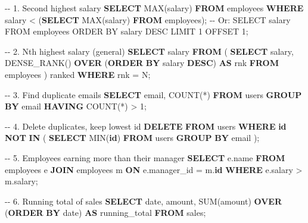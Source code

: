 \documentclass[11pt]{article}
\newenvironment{Shaded}{\begin{snugshade}}{\end{snugshade}}
\newcommand{\CommentTok}[1]{\textcolor[rgb]{0.48,0.49,0.49}{#1}}
\newcommand{\DataTypeTok}[1]{\textcolor[rgb]{0.16,0.50,0.73}{#1}}
\newcommand{\DecValTok}[1]{\textcolor[rgb]{0.96,0.45,0.00}{#1}}
\newcommand{\FunctionTok}[1]{\textcolor[rgb]{0.56,0.27,0.68}{#1}}
\newcommand{\KeywordTok}[1]{\textcolor[rgb]{0.81,0.81,0.76}{\textbf{#1}}}
\newcommand{\NormalTok}[1]{\textcolor[rgb]{0.81,0.81,0.76}{#1}}
\newcommand{\OperatorTok}[1]{\textcolor[rgb]{0.81,0.81,0.76}{#1}}
\begin{document}
\begin{Shaded}
\begin{Highlighting}[]
\CommentTok{{-}{-} 1. Second highest salary}
\KeywordTok{SELECT} \FunctionTok{MAX}\NormalTok{(salary) }\KeywordTok{FROM}\NormalTok{ employees }\KeywordTok{WHERE}\NormalTok{ salary }\OperatorTok{\textless{}}\NormalTok{ (}\KeywordTok{SELECT} \FunctionTok{MAX}\NormalTok{(salary) }\KeywordTok{FROM}\NormalTok{ employees);}
\CommentTok{{-}{-} Or: SELECT salary FROM employees ORDER BY salary DESC LIMIT 1 OFFSET 1;}

\CommentTok{{-}{-} 2. Nth highest salary (general)}
\KeywordTok{SELECT}\NormalTok{ salary }\KeywordTok{FROM}\NormalTok{ (}
    \KeywordTok{SELECT}\NormalTok{ salary, }\FunctionTok{DENSE\_RANK}\NormalTok{() }\KeywordTok{OVER}\NormalTok{ (}\KeywordTok{ORDER} \KeywordTok{BY}\NormalTok{ salary }\KeywordTok{DESC}\NormalTok{) }\KeywordTok{AS}\NormalTok{ rnk}
    \KeywordTok{FROM}\NormalTok{ employees}
\NormalTok{) ranked }\KeywordTok{WHERE}\NormalTok{ rnk }\OperatorTok{=}\NormalTok{ N;}

\CommentTok{{-}{-} 3. Find duplicate emails}
\KeywordTok{SELECT}\NormalTok{ email, }\FunctionTok{COUNT}\NormalTok{(}\OperatorTok{*}\NormalTok{) }\KeywordTok{FROM}\NormalTok{ users }\KeywordTok{GROUP} \KeywordTok{BY}\NormalTok{ email }\KeywordTok{HAVING} \FunctionTok{COUNT}\NormalTok{(}\OperatorTok{*}\NormalTok{) }\OperatorTok{\textgreater{}} \DecValTok{1}\NormalTok{;}

\CommentTok{{-}{-} 4. Delete duplicates, keep lowest id}
\KeywordTok{DELETE} \KeywordTok{FROM}\NormalTok{ users }\KeywordTok{WHERE} \KeywordTok{id} \KeywordTok{NOT} \KeywordTok{IN}\NormalTok{ (}
    \KeywordTok{SELECT} \FunctionTok{MIN}\NormalTok{(}\KeywordTok{id}\NormalTok{) }\KeywordTok{FROM}\NormalTok{ users }\KeywordTok{GROUP} \KeywordTok{BY}\NormalTok{ email}
\NormalTok{);}

\CommentTok{{-}{-} 5. Employees earning more than their manager}
\KeywordTok{SELECT}\NormalTok{ e.name}
\KeywordTok{FROM}\NormalTok{ employees e}
\KeywordTok{JOIN}\NormalTok{ employees m }\KeywordTok{ON}\NormalTok{ e.manager\_id }\OperatorTok{=}\NormalTok{ m.}\KeywordTok{id}
\KeywordTok{WHERE}\NormalTok{ e.salary }\OperatorTok{\textgreater{}}\NormalTok{ m.salary;}

\CommentTok{{-}{-} 6. Running total of sales}
\KeywordTok{SELECT} \DataTypeTok{date}\NormalTok{, amount,}
       \FunctionTok{SUM}\NormalTok{(amount) }\KeywordTok{OVER}\NormalTok{ (}\KeywordTok{ORDER} \KeywordTok{BY} \DataTypeTok{date}\NormalTok{) }\KeywordTok{AS}\NormalTok{ running\_total}
\KeywordTok{FROM}\NormalTok{ sales;}


\end{Highlighting}
\end{Shaded}
\end{document}
